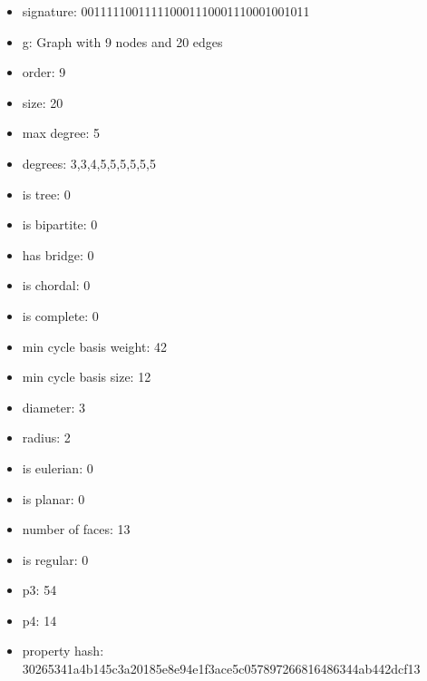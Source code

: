 \newpage
\begin{figure}
\end{figure}
\begin{itemize}
\item signature: 001111100111110001110001110001001011
\item g: Graph with 9 nodes and 20 edges
\item order: 9
\item size: 20
\item max degree: 5
\item degrees: 3,3,4,5,5,5,5,5,5
\item is tree: 0
\item is bipartite: 0
\item has bridge: 0
\item is chordal: 0
\item is complete: 0
\item min cycle basis weight: 42
\item min cycle basis size: 12
\item diameter: 3
\item radius: 2
\item is eulerian: 0
\item is planar: 0
\item number of faces: 13
\item is regular: 0
\item p3: 54
\item p4: 14
\item property hash: 30265341a4b145c3a20185e8e94e1f3ace5c057897266816486344ab442dcf13
\end{itemize}
